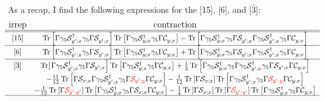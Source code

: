 \documentclass[11pt]{article}
\begin{document}
As a recap, I find the following expressions for the [15], [6], and [$\bar{3}$]:
{\tiny
\begin{displaymath}
\begin{matrix}
{\large\text{irrep}} & {\large\text{contraction}} \\
\hline
\hline
 [15]&\text{Tr}\left[\Gamma \gamma_5\mathcal{S}^\dag_{y';x}\gamma_5\Gamma\mathcal{S}^{}_{y';x}\right]
\text{Tr}\left[\Gamma \gamma_5\mathcal{S}^\dag_{y;x}\gamma_5\Gamma\mathcal{C}^{}_{y;x}\right]
-\text{Tr}\left[\Gamma \gamma_5\mathcal{S}^\dag_{y;x}\gamma_5\Gamma\mathcal{S}^{}_{y';x}\Gamma \gamma_5\mathcal{S}^\dag_{y';x}\gamma_5\Gamma\mathcal{C}^{}_{y;x}\right] \\
\hline
 [6]&\text{Tr}\left[\Gamma \gamma_5\mathcal{S}^\dag_{y';x}\gamma_5\Gamma\mathcal{S}^{}_{y';x}\right]
\text{Tr}\left[\Gamma \gamma_5\mathcal{S}^\dag_{y;x}\gamma_5\Gamma\mathcal{C}^{}_{y;x}\right]
+\text{Tr}\left[\Gamma \gamma_5\mathcal{S}^\dag_{y;x}\gamma_5\Gamma\mathcal{S}^{}_{y';x}\Gamma \gamma_5\mathcal{S}^\dag_{y';x}\gamma_5\Gamma\mathcal{C}^{}_{y;x}\right] \\
\hline
[\bar 3]&\text{Tr}[\left.\Gamma \gamma_{5} \mathcal{S}_{y^{\prime} ; x}^{\dagger} \gamma_{5} \Gamma \mathcal{S}_{y^{\prime} ; x}\right] \operatorname{Tr}\left[\Gamma \gamma_{5} \mathcal{S}_{y ; x}^{\dagger} \gamma_{5} \Gamma \mathcal{C}_{y ; x}\right]
+\frac{1}{3} \operatorname{Tr}\left[\Gamma \gamma_{5} \mathcal{S}_{y ; x}^{\dagger} \gamma_{5} \Gamma \gamma_{5} \mathcal{S}_{y^{\prime} ; x}^{\dagger} \gamma_{5} \Gamma \mathcal{S}_{y^{\prime} ; x} \Gamma \mathcal{C}_{y ; x}\right] \\
& 
-\frac{11}{12} \operatorname{Tr}\left[\Gamma \mathcal{S}_{x ; x} \Gamma \gamma_{5} \mathcal{S}_{y^{\prime} ; x}^{\dagger} \gamma_{5} \Gamma{ \color{red}\mathcal{S}_{y^{\prime} ; y} }\Gamma \mathcal{C}_{y ; x}\right]
-\frac{1}{12}\operatorname{Tr}\left[\Gamma \mathcal{S}_{x ; x}\right]\operatorname{Tr}\left[ \Gamma \gamma_{5} \mathcal{S}_{y^{\prime} ; x}^{\dagger} \gamma_{5} \Gamma {\color{red}\mathcal{S}_{y^{\prime} ; y} }\Gamma \mathcal{C}_{y ; x}\right]\\
&
-\frac{1}{12}\operatorname{Tr}\left[\Gamma {\color{red}\mathcal{S}_{y' ; y'}}\right]\operatorname{Tr}\left[ \Gamma \gamma_{5} \mathcal{S}_{y ; x}^{\dagger} \gamma_{5} \Gamma \mathcal{S}_{x ; x} \Gamma \mathcal{C}_{y ; x}\right]
-\frac{1}{4}\operatorname{Tr}\left[\Gamma \mathcal{S}_{x ; x}\right]\operatorname{Tr}\left[\Gamma {\color{red}\mathcal{S}_{y' ; y'}}\right]\operatorname{Tr}\left[ \Gamma \gamma_{5} \mathcal{S}_{y ; x}^{\dagger} \gamma_{5} \Gamma  \mathcal{C}_{y ; x}\right]\\
\hline
\end{matrix}
\end{displaymath}
}
\end{document}
